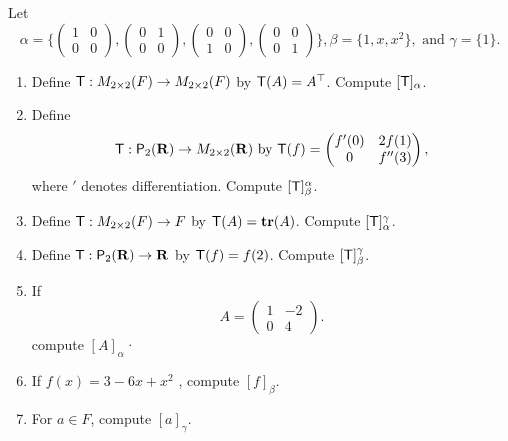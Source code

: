 \begin{exercise} \label{exercise 2.2.5}
Let
\[
    \alpha = \bigg\{
                \begin{pmatrix} 1 & 0 \\ 0 & 0 \end{pmatrix},
                \begin{pmatrix} 0 & 1 \\ 0 & 0 \end{pmatrix},
                \begin{pmatrix} 0 & 0 \\ 1 & 0 \end{pmatrix},
                \begin{pmatrix} 0 & 0 \\ 0 & 1 \end{pmatrix}
            \bigg\},
    \beta = \{ 1, x, x^{2} \},
    \text { and }
    \gamma = \{ 1 \}.
\]
\begin{enumerate}
\item Define \(\textsf{T} : M_{2 \times 2}(F) \to M_{2 \times 2}(F)\) by \(\textsf{T}(A) = A^\top\).
Compute \([\textsf{T}]_{\alpha}\).
\item Define
\[
    \textsf{T}: \textsf{P}_2(\mathbf{R}) \to M_{2 \times 2}(\mathbf{R}) \text{ by }
    \textsf{T}(f) = \begin{pmatrix} f'(0) & 2f(1) \\ 0 & f''(3) \end{pmatrix},
\]
where \('\) denotes differentiation.
Compute \([\textsf{T}]_{\beta}^{\alpha}\).
\item Define \(\textsf{T}: M_{2 \times 2}(F) \to F\) by \(\textsf{T}(A) = \textbf{tr}(A)\).
Compute \([\textsf{T}]_{\alpha}^{\gamma}\).
\item Define \(\textsf{T}: \textsf{P}_2(\mathbf{R}) \to \mathbf{R}\) by \(\textsf{T}(f) = f(2)\). 
Compute \([\textsf{T}]_{\beta}^{\gamma}\).
\item If
\[
    A = \begin{pmatrix} 1 & -2 \\ 0 & 4 \end{pmatrix}.
\]
compute \([A]_{\alpha}\)·
\item If \(f(x) = 3 - 6x + x^2\) , compute \([f]_{\beta}\).
\item For \(a \in F\), compute \([a]_{\gamma}\).
\end{enumerate}
\end{exercise}

